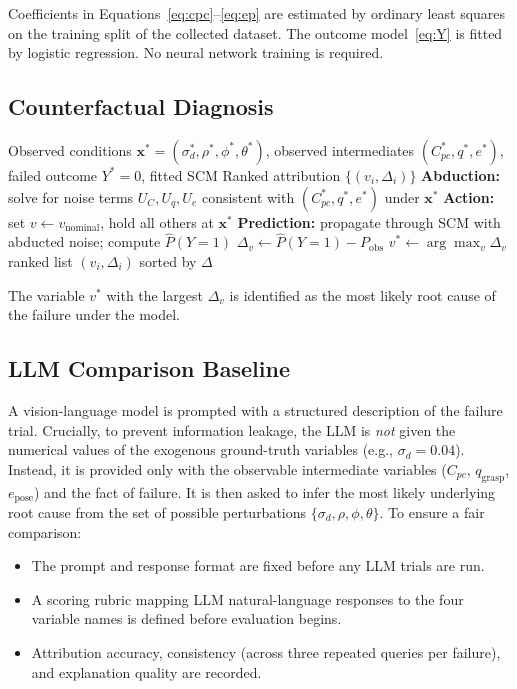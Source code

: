 \documentclass[journal]{IEEEtran}
\begin{document}
Coefficients in Equations~\eqref{eq:cpc}--\eqref{eq:ep} are
estimated by ordinary least squares on the training split of the
collected dataset.  The outcome model~\eqref{eq:Y} is fitted by
logistic regression.  No neural network training is required.

\subsection{Counterfactual Diagnosis}

\begin{algorithm}[t]
\caption{SCM Counterfactual Failure Diagnosis}
\label{alg:diagnosis}
\begin{algorithmic}[1]
\Require Observed conditions $\mathbf{x}^* = (\sigma_d^*, \rho^*,
         \phi^*, \theta^*)$, observed intermediates
         $(C_{pc}^*, q^*, e^*)$, failed outcome $Y^*{=}0$,
         fitted SCM
\Ensure  Ranked attribution $\{(v_i, \Delta_i)\}$
\State \textbf{Abduction:} solve for noise terms
       $U_C, U_q, U_e$ consistent with
       $(C_{pc}^*, q^*, e^*)$ under $\mathbf{x}^*$
  \State \textbf{Action:} set $v \leftarrow v_{\text{nominal}}$,
         hold all others at $\mathbf{x}^*$
  \State \textbf{Prediction:} propagate through SCM with
         abducted noise; compute $\hat{P}(Y{=}1)$
  \State $\Delta_v \leftarrow \hat{P}(Y{=}1) - P_{\text{obs}}$
\EndFor
\State $v^* \leftarrow \arg\max_v \Delta_v$
\State \Return ranked list $(v_i, \Delta_i)$ sorted by $\Delta$
\end{algorithmic}
\end{algorithm}

The variable $v^*$ with the largest $\Delta_v$ is identified as
the most likely root cause of the failure under the model.

\subsection{LLM Comparison Baseline}

A vision-language model is prompted with a structured description
of the failure trial. Crucially, to prevent information leakage, the LLM
is \emph{not} given the numerical values of the exogenous ground-truth
variables (e.g., $\sigma_d = 0.04$). Instead, it is provided only with the
observable intermediate variables ($C_{pc}$, $q_{\text{grasp}}$, $e_{\text{pose}}$)
and the fact of failure. It is then asked to infer the most likely
underlying root cause from the set of possible perturbations $\{\sigma_d, \rho, \phi,
\theta\}$.  To ensure a fair comparison:
\begin{itemize}
  \item The prompt and response format are fixed before any LLM
        trials are run.
  \item A scoring rubric mapping LLM natural-language responses to
        the four variable names is defined before evaluation begins.
  \item Attribution accuracy, consistency (across three repeated
        queries per failure), and explanation quality are recorded.
\end{itemize}
\end{document}

